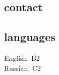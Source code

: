 \begin{paracol}{2}


	\begin{flushright}
		\subsection{contact}
		

		\subsection{languages}
		English: B2 \\
		Russian: C2 \\

		
	\end{flushright}
	\switchcolumn

	

	


	


	





\end{paracol}

